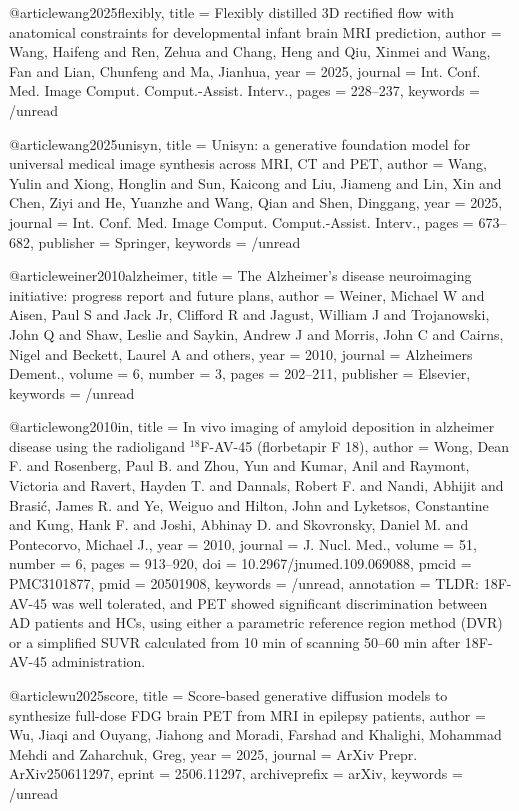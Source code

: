 @article{wang2025flexibly,
  title = {Flexibly distilled {{3D}} rectified flow with anatomical constraints for developmental infant brain {{MRI}} prediction},
  author = {Wang, Haifeng and Ren, Zehua and Chang, Heng and Qiu, Xinmei and Wang, Fan and Lian, Chunfeng and Ma, Jianhua},
  year = 2025,
  journal = {Int. Conf. Med. Image Comput. Comput.-Assist. Interv.},
  pages = {228--237},
  keywords = {/unread}
}

@article{wang2025unisyn,
  title = {Unisyn: a generative foundation model for universal medical image synthesis across {{MRI}}, {{CT}} and {{PET}}},
  author = {Wang, Yulin and Xiong, Honglin and Sun, Kaicong and Liu, Jiameng and Lin, Xin and Chen, Ziyi and He, Yuanzhe and Wang, Qian and Shen, Dinggang},
  year = 2025,
  journal = {Int. Conf. Med. Image Comput. Comput.-Assist. Interv.},
  pages = {673--682},
  publisher = {Springer},
  keywords = {/unread}
}

@article{weiner2010alzheimer,
  title = {The {{Alzheimer}}'s disease neuroimaging initiative: progress report and future plans},
  author = {Weiner, Michael W and Aisen, Paul S and Jack Jr, Clifford R and Jagust, William J and Trojanowski, John Q and Shaw, Leslie and Saykin, Andrew J and Morris, John C and Cairns, Nigel and Beckett, Laurel A and others},
  year = 2010,
  journal = {Alzheimers Dement.},
  volume = {6},
  number = {3},
  pages = {202--211},
  publisher = {Elsevier},
  keywords = {/unread}
}

@article{wong2010in,
  title = {In vivo imaging of amyloid deposition in alzheimer disease using the radioligand {$^{18}$}{{F-AV-45}} (florbetapir {{F}} 18)},
  author = {Wong, Dean F. and Rosenberg, Paul B. and Zhou, Yun and Kumar, Anil and Raymont, Victoria and Ravert, Hayden T. and Dannals, Robert F. and Nandi, Abhijit and Brasi{\'c}, James R. and Ye, Weiguo and Hilton, John and Lyketsos, Constantine and Kung, Hank F. and Joshi, Abhinay D. and Skovronsky, Daniel M. and Pontecorvo, Michael J.},
  year = 2010,
  journal = {J. Nucl. Med.},
  volume = {51},
  number = {6},
  pages = {913--920},
  doi = {10.2967/jnumed.109.069088},
  pmcid = {PMC3101877},
  pmid = {20501908},
  keywords = {/unread},
  annotation = {TLDR: 18F-AV-45 was well tolerated, and PET showed significant discrimination between AD patients and HCs, using either a parametric reference region method (DVR) or a simplified SUVR calculated from 10 min of scanning 50--60 min after 18F- AV-45 administration.}
}

@article{wu2025score,
  title = {Score-based generative diffusion models to synthesize full-dose {{FDG}} brain {{PET}} from {{MRI}} in epilepsy patients},
  author = {Wu, Jiaqi and Ouyang, Jiahong and Moradi, Farshad and Khalighi, Mohammad Mehdi and Zaharchuk, Greg},
  year = 2025,
  journal = {ArXiv Prepr. ArXiv250611297},
  eprint = {2506.11297},
  archiveprefix = {arXiv},
  keywords = {/unread}
}

